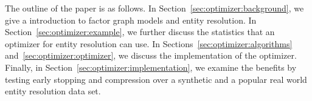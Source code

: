 The outline of the paper is as follows.
In Section~\ref{sec:optimizer:background}, we give a introduction to factor graph models and entity resolution.
In Section~\ref{sec:optimizer:example}, we further discuss the statistics that an optimizer for entity resolution can use.
In Sections~\ref{sec:optimizer:algorithms} and~\ref{sec:optimizer:optimizer}, we discuss the implementation of the optimizer.
Finally, in Section~\ref{sec:optimizer:implementation}, we examine
the benefits by testing early stopping and compression over a synthetic and a popular real world entity resolution data set.



